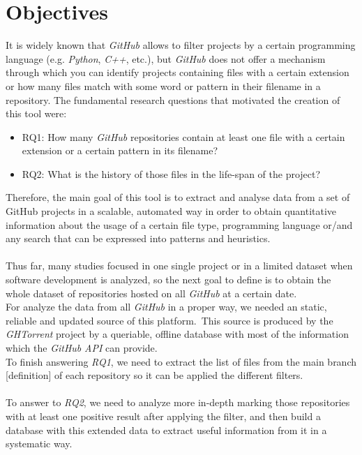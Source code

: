 \documentclass[a4paper, 12pt]{book}
\begin{document}
\chapter{Objectives}
\label{chap:objetivos}
It is widely known that \emph{GitHub} allows to filter projects by a certain programming language (e.g.
\emph{Python}, \emph{C++}, etc.), but \emph{GitHub} does not offer a mechanism through which you can identify projects
containing files with a certain extension or how many files match with some word or pattern in their
filename in a repository. The fundamental research questions that motivated the creation of this tool were:
\begin{itemize}
  \item RQ1: How many \emph{GitHub} repositories contain at least one file with a certain extension or a certain
        pattern in its filename?
  \item RQ2: What is the history of those files in the life-span of the project?
\end{itemize}
Therefore, the main goal of this tool is to extract and analyse data from a set of GitHub projects in a scalable,
automated way in order to obtain quantitative information about the usage of a certain file type, programming language
or/and any search that can be expressed into patterns and heuristics.\\\\
Thus far, many studies focused in one single project or in a limited dataset when software development is analyzed, so
the next goal to define is to obtain the whole dataset of repositories hosted on all \emph{GitHub} at a certain date.\\
For analyze the data from all \emph{GitHub} in a proper way, we needed an static, reliable and updated source of this platform.\
This source is produced by the \emph{GHTorrent} project by a queriable, offline database with most of the information which the
\emph{GitHub} \textit{API} can provide.\\
To finish answering \emph{RQ1}, we need to extract the list of files from the main branch [definition] of each repository so
it can be applied the different filters.\\\\
To answer to \emph{RQ2}, we need to analyze more in-depth marking those repositories with at least one positive result
after applying the filter, and then build a database with this extended data to extract useful information from it in a
systematic way.
\cleardoublepage
\end{document}
